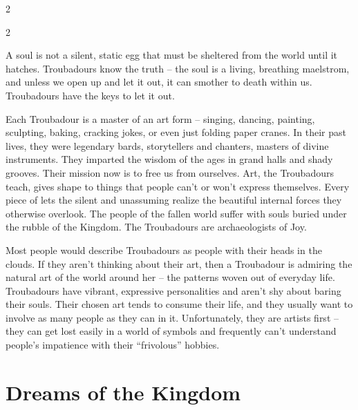\begin{multicols}{2}
\end{multicols}\newpage{}
\label{scha:Troubadour}\begin{multicols}{2}\raggedcolumns

\noindent A soul is not a silent, static egg that must be sheltered from the world until it hatches. Troubadours know the truth – the soul is a living, breathing maelstrom, and unless we open up and let it out, it can smother to death within us. Troubadours have the keys to let it out.

Each Troubadour is a master of an art form – singing, dancing, painting, sculpting, baking, cracking jokes, or even just folding paper cranes. In their past lives, they were legendary bards, storytellers and chanters, masters of divine instruments. They imparted the wisdom of the ages in grand halls and shady grooves.  Their mission now is to free us from ourselves. Art, the Troubadours teach, gives shape to things that people can't or won't express themselves. Every piece of lets the silent and unassuming realize the beautiful internal forces they otherwise overlook. The people of the fallen world suffer with souls buried under the rubble of the Kingdom. The Troubadours are archaeologists of Joy.

Most people would describe Troubadours as people with their heads in the clouds. If they aren't thinking about their art, then a Troubadour is admiring the natural art of the world around her – the patterns woven out of everyday life. Troubadours have vibrant, expressive personalities and aren't shy about baring their souls. Their chosen art tends to consume their life, and they usually want to involve as many people as they can in it. Unfortunately, they are artists first – they can get lost easily in a world of symbols and frequently can't understand people's impatience with their “frivolous” hobbies. 

\section*{Dreams of the Kingdom}


\end{multicols}
